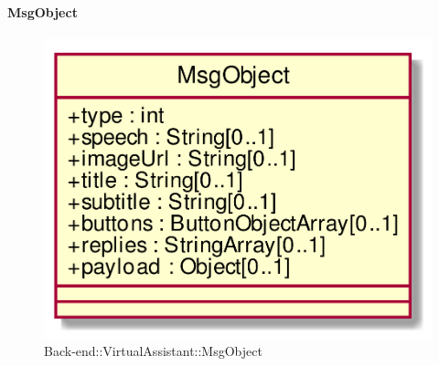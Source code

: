 \hypertarget{MsgObject_label}{\paragraph{MsgObject}}
\begin{figure}[h]
	\centering
	\includegraphics[width=\textwidth,height=\textheight,keepaspectratio]{images/ClassMsgObject.png}
	\caption{Back-end::VirtualAssistant::MsgObject}
\end{figure}
